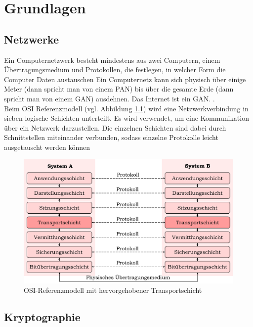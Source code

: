 \chapter{Grundlagen}
\label{ch:grundlagen}

	\section{Netzwerke}
	\label{sec:grundlagen:netzwerke}
	
	Ein Computernetzwerk besteht mindestens aus zwei Computern, einem Übertragungsmedium und Protokollen, die festlegen, in welcher Form die Computer Daten austauschen Ein Computernetz kann sich physisch über einige Meter (dann spricht man von einem \ac{PAN}) bis über die gesamte Erde (dann spricht man von einem \ac{GAN}) ausdehnen. Das Internet ist ein GAN. \cite{Baun2018-A}.\\
	
	Beim \ac{OSI} Referenzmodell (vgl. Abbildung \ref{fig:grundlagen:osi}) wird eine Netzwerkverbindung in sieben logische Schichten unterteilt. Es wird verwendet, um eine Kommunikation über ein Netzwerk darzustellen. Die einzelnen Schichten sind dabei durch Schnittstellen miteinander verbunden, sodass einzelne Protokolle leicht ausgetauscht werden können \cite{Baun2018-B}
	
	\begin{figure}[htbp]
		\centering
		\includegraphics[width=\textwidth]{chapters/abb/grundlagen-osi}
		\caption{OSI-Referenzmodell mit hervorgehobener Transportschicht}
		\label{fig:grundlagen:osi}
	\end{figure}

	\section{Kryptographie}
	\label{sec:grundlagen:krypto}
	
